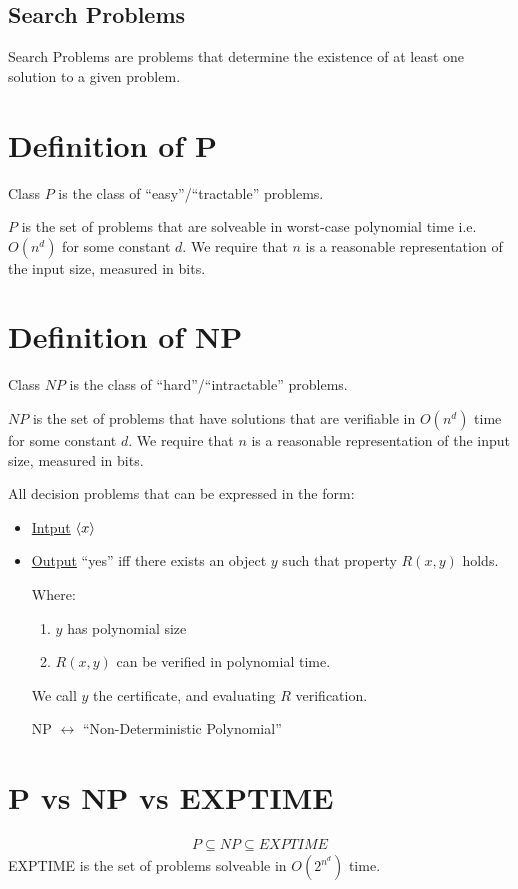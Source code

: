         \subsection{Search Problems}
            Search Problems are problems that determine the existence of at
            least one solution to a given problem.
    \section{Definition of P}
        Class $P$ is the class of ``easy''/``tractable'' problems.

        $P$ is the set of problems that are solveable in worst-case polynomial
        time i.e. $O(n^d)$ for some constant $d$. We require that $n$ is a
        reasonable representation of the input size, measured in bits.
    \section{Definition of NP}
        Class $NP$ is the class of ``hard''/``intractable'' problems.

        $NP$ is the set of problems that have solutions that are verifiable in
        $O(n^d)$ time for some constant $d$. We require that $n$ is a reasonable
        representation of the input size, measured in bits.

        All decision problems that can be expressed in the form:
        \begin{itemize}
            \item \uline{Intput} $\left \langle x \right \rangle $
            \item \uline{Output} ``yes'' iff there exists an object $y$ such
                that property $R(x, y)$ holds.

                Where:
                \begin{enumerate}
                    \item $y$ has polynomial size
                    \item $R(x, y)$ can be verified in polynomial time.
                \end{enumerate}
                We call $y$ the certificate, and evaluating $R$ verification.

                NP $\leftrightarrow$ ``Non-Deterministic Polynomial''
        \end{itemize}

    \section{P vs NP vs EXPTIME}
        \begin{align*}
            P \subseteq NP \subseteq EXPTIME
        \end{align*}
        EXPTIME is the set of problems solveable in $O(2^{n^d})$ time.

